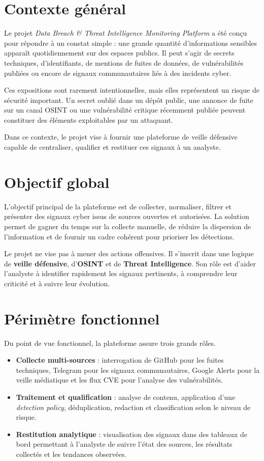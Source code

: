 \documentclass[12pt,a4paper]{report}
\newcommand{\projetnom}{Data Breach \& Threat Intelligence Monitoring Platform}
\begin{document}
\section{Contexte général}

Le projet \textit{\projetnom{}} a été conçu pour répondre à un constat simple : une grande quantité d'informations sensibles apparaît quotidiennement sur des espaces publics. Il peut s'agir de secrets techniques, d'identifiants, de mentions de fuites de données, de vulnérabilités publiées ou encore de signaux communautaires liés à des incidents cyber.

Ces expositions sont rarement intentionnelles, mais elles représentent un risque de sécurité important. Un secret oublié dans un dépôt public, une annonce de fuite sur un canal OSINT ou une vulnérabilité critique récemment publiée peuvent constituer des éléments exploitables par un attaquant.

Dans ce contexte, le projet vise à fournir une plateforme de veille défensive capable de centraliser, qualifier et restituer ces signaux à un analyste.

\section{Objectif global}

L'objectif principal de la plateforme est de collecter, normaliser, filtrer et présenter des signaux cyber issus de sources ouvertes et autorisées. La solution permet de gagner du temps sur la collecte manuelle, de réduire la dispersion de l'information et de fournir un cadre cohérent pour prioriser les détections.

Le projet ne vise pas à mener des actions offensives. Il s'inscrit dans une logique de \textbf{veille défensive}, d'\textbf{OSINT} et de \textbf{Threat Intelligence}. Son rôle est d'aider l'analyste à identifier rapidement les signaux pertinents, à comprendre leur criticité et à suivre leur évolution.

\section{Périmètre fonctionnel}

Du point de vue fonctionnel, la plateforme assure trois grands rôles.

\begin{itemize}
  \item \textbf{Collecte multi-sources} : interrogation de GitHub pour les fuites techniques, Telegram pour les signaux communautaires, Google Alerts pour la veille médiatique et les flux CVE pour l'analyse des vulnérabilités.
  \item \textbf{Traitement et qualification} : analyse de contenu, application d'une \textit{detection policy}, déduplication, redaction et classification selon le niveau de risque.
  \item \textbf{Restitution analytique} : visualisation des signaux dans des tableaux de bord permettant à l'analyste de suivre l'état des sources, les résultats collectés et les tendances observées.
\end{itemize}
\end{document}
